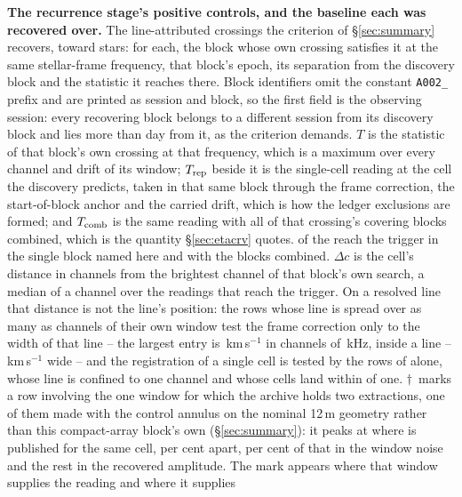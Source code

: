 \begin{table}
\centering
\caption{\textbf{The recurrence stage's positive controls, and the baseline
each was recovered over.} The \QcNCtl{} line-attributed crossings the
criterion of \S\ref{sec:summary} recovers, toward \QcNStar{} stars: for each,
the block whose own crossing satisfies it at the same stellar-frame
frequency, that block's epoch, its separation from the discovery block and
the statistic it reaches there. Block identifiers omit the constant
\texttt{A002\_} prefix and are printed as session and block, so the first
field is the observing session: every recovering block belongs to a different
session from its discovery block and lies more than \EpSep{} day from it, as
the criterion demands. $T$ is the statistic of that
block's own crossing at that frequency, which is a maximum over every channel
and drift of its window; $T_{\rm rep}$ beside it is the single-cell reading at
the cell the discovery predicts, taken in that same block through the frame
correction, the start-of-block anchor and the carried drift, which is how the
\RcNExcl{} ledger exclusions are formed; and $T_{\rm comb}$ is the
same reading with all of that crossing's covering blocks combined, which is
the quantity \S\ref{sec:etacrv} quotes. \RgNCtlSingle{} of the \RgNCtl{}
reach the trigger in the single block named here and \RgNCtlComb{} with the
blocks combined. $\Delta c$ is the cell's distance in channels from the
brightest channel of that block's own search, a median \RgCtlDchAbsMed{} of a
channel over the readings that reach the trigger. On a resolved line that
distance is not the line's position: the \RgRegNRes{} rows whose line is
spread over as many as \RgResFwhmChMax{} channels of their own window test the
frame correction only to the width of that line -- the largest entry is
\RgOffMaxKms\,km\,s$^{-1}$ in channels of \RgOffMaxChanKHz\,kHz, inside a line
\RgFwhmLoKms{}--\RgFwhmHiKms\,km\,s$^{-1}$ wide -- and the registration of a
single cell is tested by the \RgRegNUnres{} rows of \RgRegStar{} alone, whose
line is confined to one channel and whose cells land within \RgRegMaxCh{} of
one.
$\dagger$~marks a row involving the one window for which the archive holds
two extractions, one of them made with the control annulus on the nominal
12\,m geometry rather than this compact-array block's own
(\S\ref{sec:summary}): it peaks at \LrSuppOwn{} where \LrSuppPub{} is
published for the same cell, \LrSuppPct{} per cent apart, \NbProvRmsPct{}
per cent of that in the window noise and the rest in the recovered amplitude.
The mark appears where that window supplies the reading and where it supplies
}
\end{table}
